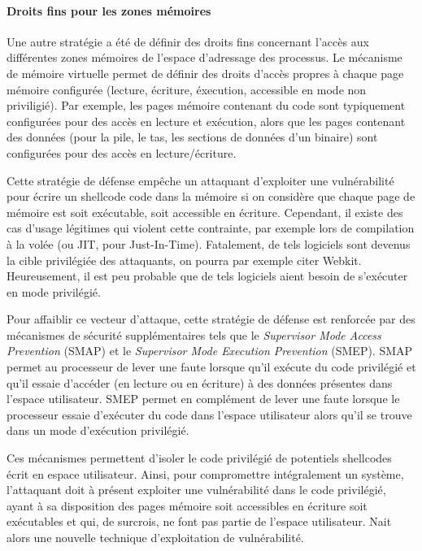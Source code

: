 \paragraph{Droits fins pour les zones mémoires}
\label{memory_rights}
Une autre stratégie a été de définir des droits fins concernant l'accès aux différentes zones mémoires de l'espace d'adressage des processus. Le mécanisme de mémoire virtuelle permet de définir des droits d'accès propres à chaque page mémoire configurée (lecture, écriture, éxecution, accessible en mode non priviligié). Par exemple, les pages mémoire contenant du code sont typiquement configurées pour des accès en lecture et exécution, alors que les pages contenant des données (pour la pile, le tas, les sections de données d'un binaire) sont configurées pour des accès en lecture/écriture.

Cette stratégie de défense empêche un attaquant d'exploiter une vulnérabilité pour écrire un shellcode code dans la mémoire si on considère que chaque page de mémoire est soit exécutable, soit accessible en écriture. Cependant, il existe des cas d'usage légitimes qui violent cette contrainte, par exemple lors de compilation à la volée (ou JIT, pour Just-In-Time). Fatalement, de tels logiciels sont devenus la cible privilégiée des attaquants, on pourra par exemple citer Webkit.%
Heureusement, il est peu probable que de tels logiciels aient besoin de s'exécuter en mode privilégié. 

Pour affaiblir ce vecteur d'attaque, cette stratégie de défense est renforcée par des mécanismes de sécurité supplémentaires tels que le \emph{Supervisor Mode Access Prevention} (SMAP) et le \emph{Supervisor Mode Execution Prevention} (SMEP). SMAP permet au processeur de lever une faute lorsque qu'il exécute du code privilégié et qu'il essaie d'accéder (en lecture ou en écriture) à des données présentes dans l'espace utilisateur. SMEP permet en complément de lever une faute lorsque le processeur essaie d'exécuter du code dans l'espace utilisateur alors qu'il se trouve dans un mode d'exécution privilégié.

Ces mécanismes permettent d'isoler le code privilégié de potentiels shellcodes écrit en espace utilisateur. Ainsi, pour compromettre intégralement un système, l'attaquant doit à présent exploiter une vulnérabilité dans le code privilégié, ayant à sa disposition des pages mémoire soit accessibles en écriture soit exécutables et qui, de surcrois, ne font pas partie de l'espace utilisateur.
Nait alors une nouvelle technique d'exploitation de vulnérabilité. 

